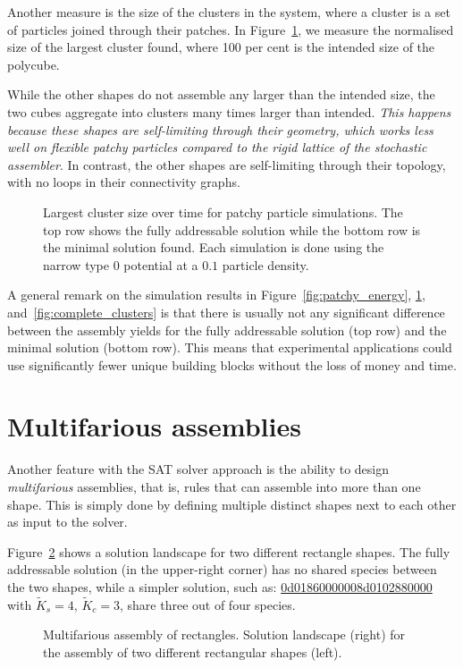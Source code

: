 Another measure is the size of the clusters in the system, where a cluster is a set of particles joined through their patches. In Figure~\ref{fig:max_cluster}, we measure the normalised size of the largest cluster found, where 100 per cent is the intended size of the polycube. 

While the other shapes do not assemble any larger than the intended size, the two cubes aggregate into clusters many times larger than intended. \emph{This happens because these shapes are self-limiting through their geometry, which works less well on flexible patchy particles compared to the rigid lattice of the stochastic assembler}. In contrast, the other shapes are self-limiting through their topology, with no loops in their connectivity graphs.

\begin{figure}[ht]
    \centering
    \caption{Largest cluster size over time for patchy particle simulations. The top row shows the fully addressable solution while the bottom row is the minimal solution found. Each simulation is done using the narrow type \(0\) potential at a \(0.1\) particle density.}
    \label{fig:max_cluster}
\end{figure}



A general remark on the simulation results in Figure~\ref{fig:patchy_energy}, \ref{fig:max_cluster}, and~\ref{fig:complete_clusters} is that there is usually not any significant difference between the assembly yields for the fully addressable solution (top row) and the minimal solution (bottom row). This means that experimental applications could use significantly fewer unique building blocks without the loss of money and time.

\section{Multifarious assemblies}

Another feature with the SAT solver approach is the ability to design \emph{multifarious} assemblies, that is, rules that can assemble into more than one shape. This is simply done by defining multiple distinct shapes next to each other as input to the solver.

Figure~\ref{fig:multifarious_rectangles} shows a solution landscape for two different rectangle shapes. The fully addressable solution (in the upper-right corner) has no shared species between the two shapes, while a simpler solution, such as: \href{https://akodiat.github.io/polycubes/?assemblyMode=stochastic&rule=0d01860000000501860000000905020000008d0102880000}{0d0186000000\allowbreak8d0102880000}
with \(\widetilde{K}_s=4\), \(\widetilde{K}_c=3\), share three out of four species.

\begin{figure}[ht]
    \centering
    \caption{Multifarious assembly of rectangles. Solution landscape (right) for the assembly of two different rectangular shapes (left).}
    \label{fig:multifarious_rectangles}
\end{figure}